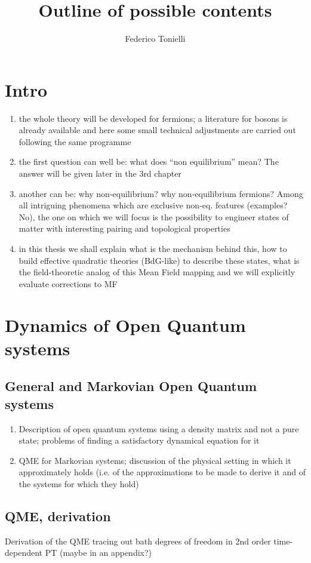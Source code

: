 \documentclass[a4paper,10pt]{article}
\title{Outline of possible contents}
\author{Federico Tonielli}
\theoremstyle{remark}
\newcommand{\nsec}{\vskip 0.8cm}
\begin{document}
 

 \section{Intro}
  \begin{enumerate}
   \item the whole theory will be developed for fermions; a literature for bosons is already available and here some small technical adjustments are carried out following the same programme
   \item the first question can well be: what does ``non equilibrium'' mean? The answer will be given later in the 3rd chapter
   \item another can be: why non-equilibrium? why non-equilibrium fermions? Among all intriguing phenomena which are exclusive non-eq. features (examples? No), the one on which we will focus is the possibility to engineer states of matter with interesting pairing and topological properties 
   \item in this thesis we shall explain what is the mechanism behind this, how to build effective quadratic theories (BdG-like) to describe these states, what is the field-theoretic analog of this Mean Field mapping and we will explicitly evaluate corrections to MF
  \end{enumerate}
 \nsec
 
 \section{Dynamics of Open Quantum systems}
  \subsection{General and Markovian Open Quantum systems}
   \begin{enumerate}
    \item Description of open quantum systems using a density matrix and not a pure state; problems of finding a satisfactory dynamical equation for it
    \item QME for Markovian systems; discussion of the physical setting in which it approximately holds (i.e. of the approximations to be made to derive it and of the systems for which they hold)
   \end{enumerate}
  \subsection{QME, derivation}
   Derivation of the QME tracing out bath degrees of freedom in 2nd order time-dependent PT (maybe in an appendix?) 
 \nsec  
 
\end{document}
